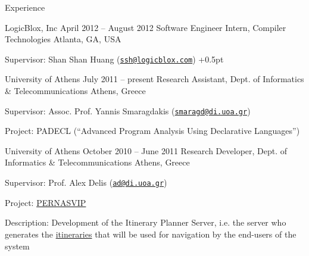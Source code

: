 \documentclass{resume}
\begin{document}
\begin{rSection}{Experience}

\begin{rSubsection}{LogicBlox, Inc}
  {April 2012 -- August 2012}
  {Software Engineer Intern, Compiler Technologies}
  {Atlanta, GA, USA}
\item Supervisor: Shan Shan Huang
  (\href{mailto:ssh@logicblox.com}{\nolinkurl{ssh@logicblox.com}})
\itemsep +0.5pt %
\end{rSubsection}


\begin{rSubsection}
  {University of Athens}
  {July 2011 -- present}
  {Research Assistant, Dept. of Informatics \& Telecommunications}
  {Athens, Greece}
\item Supervisor: Assoc. Prof. Yannis Smaragdakis
  (\href{mailto:smaragd@di.uoa.gr}{\nolinkurl{smaragd@di.uoa.gr}})
\item Project: PADECL (``Advanced Program Analysis Using Declarative
  Languages'')
\end{rSubsection}


\begin{rSubsection}
  {University of Athens}
  {October 2010 -- June 2011}
  {Research Developer, Dept. of Informatics \& Telecommunications}
  {Athens, Greece}
\item Supervisor: Prof. Alex Delis
  (\href{mailto:ad@di.uoa.gr}{\nolinkurl{ad@di.uoa.gr}})
\item Project: \href{http://pernasvip.di.uoa.gr/index.php}{PERNASVIP}
\item Description: Development of the Itinerary Planner Server,
  i.e. the server who generates the
  \href{http://pernasvip.di.uoa.gr/index.php/gen-spef/itinerary-example}{itineraries}
  that will be used for navigation by the end-users of the system
\end{rSubsection}

\end{rSection}
\end{document}
